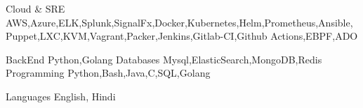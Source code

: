 

\begin{cvskills}

  \cvskill
    {Cloud & SRE} %
	{AWS,Azure,ELK,Splunk,SignalFx,Docker,Kubernetes,Helm,Prometheus,Ansible,Puppet,LXC,KVM,Vagrant,Packer,Jenkins,Gitlab-CI,Github Actions,EBPF,ADO} %

  \cvskill
   {BackEnd} %
	{Python,Golang} %
  \cvskill
   {Databases} %
	{Mysql,ElasticSearch,MongoDB,Redis} %
  \cvskill
   {Programming} %
	{Python,Bash,Java,C,SQL,Golang} %

  \cvskill
    {Languages} %
	{English, Hindi} %

\end{cvskills}
